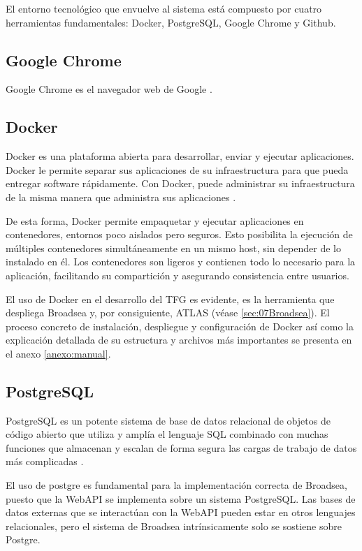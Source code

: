 El entorno tecnológico que envuelve al sistema está compuesto por cuatro herramientas fundamentales: Docker, PostgreSQL, Google Chrome y Github.


\subsection{Google Chrome}

Google Chrome es el navegador web de Google \cite{GoogleChrome}. 

\subsection{Docker}

Docker es una plataforma abierta para desarrollar, enviar y ejecutar aplicaciones. Docker le permite separar sus aplicaciones de su infraestructura para que pueda entregar software rápidamente. Con Docker, puede administrar su infraestructura de la misma manera que administra sus aplicaciones \cite{DockerWebsite}.

De esta forma, Docker permite empaquetar y ejecutar aplicaciones en contenedores, entornos poco aislados pero seguros. Esto posibilita la ejecución de múltiples contenedores simultáneamente en un mismo host, sin depender de lo instalado en él. Los contenedores son ligeros y contienen todo lo necesario para la aplicación, facilitando su compartición y asegurando consistencia entre usuarios. 

El uso de Docker en el desarrollo del TFG es evidente, es la herramienta que despliega Broadsea y, por consiguiente, ATLAS (véase \ref{sec:07Broadsea}). El proceso concreto de instalación, despliegue y configuración de Docker así como la explicación detallada de su estructura y archivos más importantes se presenta en el anexo \ref{anexo:manual}.

\subsection{PostgreSQL}

PostgreSQL es un potente sistema de base de datos relacional de objetos de código abierto que utiliza y amplía el lenguaje SQL combinado con muchas funciones que almacenan y escalan de forma segura las cargas de trabajo de datos más complicadas \cite{PostgreWebsite}.

El uso de postgre es fundamental para la implementación correcta de Broadsea, puesto que la WebAPI se implementa sobre un sistema PostgreSQL. Las bases de datos externas que se interactúan con la WebAPI pueden estar en otros lenguajes relacionales, pero el sistema de Broadsea intrínsicamente solo se sostiene sobre Postgre.

